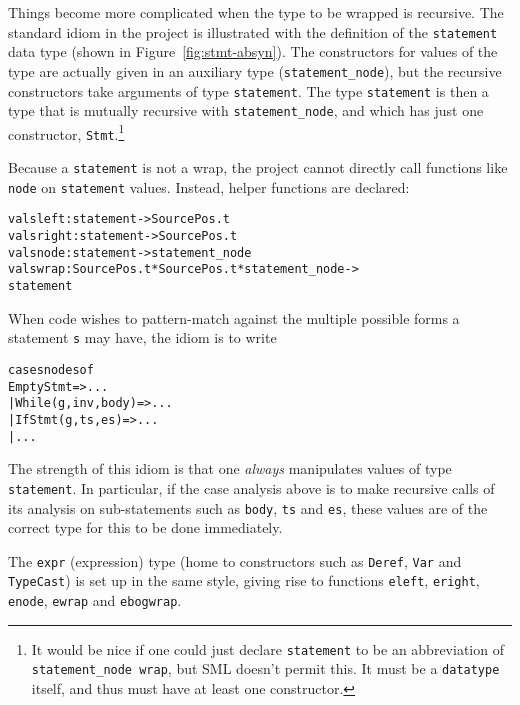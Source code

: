 \documentclass{article}
\begin{document}
Things become more complicated when the type to be wrapped is
recursive.  The standard idiom in the project is illustrated with the
definition of the \texttt{statement} data type (shown in
Figure~\ref{fig:stmt-absyn}).  The constructors for values of the type
are actually given in an auxiliary type (\texttt{statement_node}),
but the recursive constructors take arguments of type
\texttt{statement}.  The type \texttt{statement} is then a type that
is mutually recursive with \texttt{statement_node}, and which has
just one constructor, \texttt{Stmt}.\footnote{It would be nice if one
  could just declare \texttt{statement} to be an abbreviation of
  \texttt{statement_node~wrap}, but SML doesn't permit this.  It must
  be a \texttt{datatype} itself, and thus must have at least one
  constructor.}

Because a \texttt{statement} is not a wrap, the project cannot
directly call functions like \texttt{node} on \texttt{statement}
values.  Instead, helper functions are declared:
\begin{alltt}
   val sleft  : statement -> SourcePos.t
   val sright : statement -> SourcePos.t
   val snode  : statement -> statement_node
   val swrap  : SourcePos.t * SourcePos.t * statement_node ->
                statement
\end{alltt}
When code wishes to pattern-match against the multiple possible forms
a statement \texttt{s} may have, the idiom is to write
\begin{alltt}
   case snode s of
     EmptyStmt => ...
   | While(g,inv,body) => ...
   | IfStmt(g,ts,es) => ...
   | ...
\end{alltt}
The strength of this idiom is that one \emph{always} manipulates
values of type \texttt{statement}.  In particular, if the case
analysis above is to make recursive calls of its analysis on
sub-statements such as \texttt{body}, \texttt{ts} and \texttt{es},
these values are of the correct type for this to be done immediately.

The \texttt{expr} (expression) type (home to constructors such as
\texttt{Deref}, \texttt{Var} and \texttt{TypeCast}) is set up in the
same style, giving rise to functions \texttt{eleft}, \texttt{eright},
\texttt{enode}, \texttt{ewrap} and \texttt{ebogwrap}.
\end{document}
